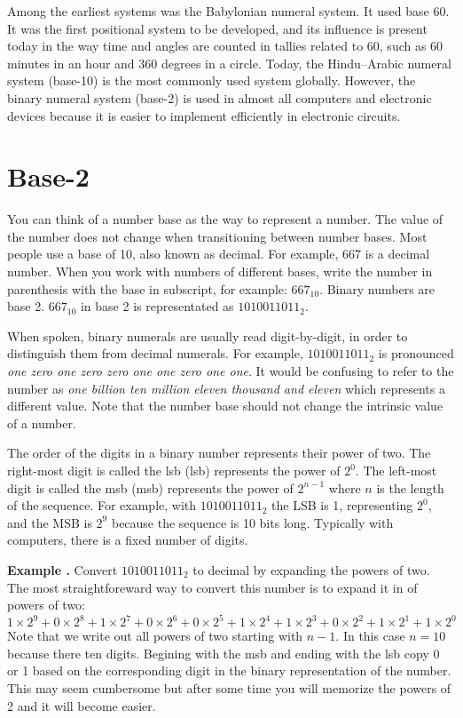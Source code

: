\documentclass[letterpaper, 10pt]{book}
\newcommand*{\example}[1]{\vspace{1em}\noindent
    \colorbox{blue!10}{\noindent
        \begin{minipage}{\textwidth}
            \textbf{Example \thechapter.\arabic{examples}}\stepcounter{examples}
            #1
        \end{minipage}
    }\vspace{1em}
}
\begin{document}
Among the earliest systems was the Babylonian numeral system. It used base 60. It was the first 
positional system to be developed, and its influence is present today in the way time and angles are 
counted in tallies related to 60, such as 60 minutes in an hour and 360 degrees in a circle. Today, 
the Hindu–Arabic numeral system (base-10) is the most commonly used system globally. However, 
the binary numeral system (base-2) is used in almost all computers and electronic devices because it 
is easier to implement efficiently in electronic circuits. 

\section{Base-2\label{sec:data:bases}}

You can think of a number base as the way to represent a number. The value of the number does not 
change when transitioning between number bases. Most people use a base of 10, also known as decimal. 
For example, 667 is a decimal number. When you work with numbers of different bases, write the number 
in parenthesis with the base in subscript, for example: $667_{10}$. Binary numbers are base 2. 
$667_{10}$ in base 2 is representated as $1010011011_2$. 

When spoken, binary numerals are usually read digit-by-digit, in order to distinguish them from 
decimal numerals. For example, $1010011011_2$ is pronounced \textit{one zero one zero zero one 
one zero one one}. It would be confusing to refer to the number as \textit{one billion ten million 
eleven thousand and eleven} which represents a different value. Note that the number base should 
not change the intrinsic value of a number.

The order of the digits in a binary number represents their power of two. The right-most digit is 
called the \acrlong{lsb} (\acrshort{lsb}) represents the power of $2^0$. The left-most digit is called 
the \acrlong{msb} (\acrshort{msb}) represents the power of $2^{n-1}$ where $n$ is the length of the 
sequence. For example, with $1010011011_2$ the LSB is 1, representing $2^0$, and the MSB is $2^9$ 
because the sequence is 10 bits long. Typically with computers, there is a fixed number of digits.

\example{Convert $1010011011_2$ to decimal by expanding the powers of two. The most straightforeward %
way to convert this number is to expand it in of powers of two:%
%
\begin{equation}\label{sec:data:bases:667bin}%
	1 \times 2^9 + 0 \times 2^8 + 1 \times 2^7 + 0 \times 2^6 + 0 \times 2^5 + 1 \times 2^4 
    + 1 \times 2^3 + 0 \times 2^2 + 1 \times 2^1 + 1 \times 2^0
\end{equation}%
Note that we write out all powers of two starting with $n-1$. In this case $n=10$ because there %
ten digits. Begining with the \acrshort{msb} and ending with the \acrshort{lsb} copy 0 or 1 %
based on the corresponding digit in the binary representation of the number. This may seem cumbersome %
but after some time you will memorize the powers of 2 and it will become easier.}
\end{document}
